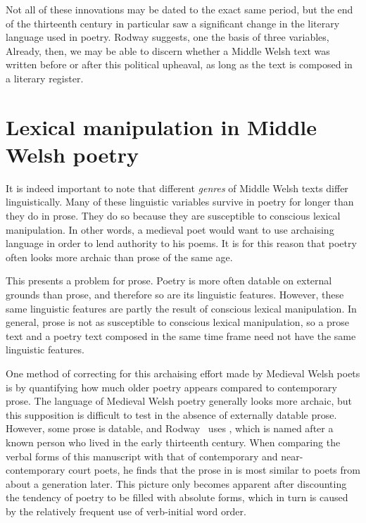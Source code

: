 Not all of these innovations may be dated to the exact same period, but the end of the thirteenth century in particular saw a significant change in the literary language used in poetry. Rodway suggests, one the basis of three variables,  Already, then, we may be able to discern whether a Middle Welsh text was written before or after this political upheaval, as long as the text is composed in a literary register.
\section{Lexical manipulation in Middle Welsh poetry}
It is indeed important to note that different \textit{genres} of Middle Welsh texts differ linguistically. Many of these linguistic variables survive in poetry for longer than they do in prose. They do so because they are susceptible to conscious lexical manipulation. In other words, a medieval poet would want to use archaising language in order to lend authority to his poems. It is for this reason that poetry often looks more archaic than prose of the same age. 

This presents a problem for prose. Poetry is more often datable on external grounds than prose, and therefore so are its linguistic features. However, these same linguistic features are partly the result of conscious lexical manipulation. In general, prose is not as susceptible to conscious lexical manipulation, so a prose text and a poetry text composed in the same time frame need not have the same linguistic features. 

One method of correcting for this archaising effort made by Medieval Welsh poets is by quantifying how much older poetry appears compared to contemporary prose. The language of Medieval Welsh poetry generally looks more archaic, but this supposition is difficult to test in the absence of externally datable prose. However, some prose is datable, and Rodway~\parencite[167-168]{rodway_dating_2013} uses , which is named after a known person who lived in the early thirteenth century. When comparing the verbal forms of this manuscript with that of contemporary and near-contemporary court poets, he finds that the prose in  is most similar to poets from about a generation later. This picture only becomes apparent after discounting the tendency of poetry to be filled with absolute forms, which in turn is caused by the relatively frequent use of verb-initial word order. 

